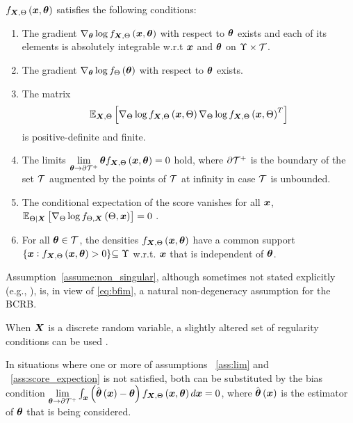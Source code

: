 \begin{assumption}
    \label{assum:bcrb_reg}
$\probt{\x,\p}{\X,\pr}$ 
satisfies the following conditions:  
\begin{enumerate}[label={\ref*{assum:bcrb_reg}}.\arabic*,labelsep=*, leftmargin=*]

\item\label{sas:derivative} The gradient $\nabla_{\p}\log\probt{\x,\p}{\X,\pr}$ with respect to $\bm{\theta}$  exists and {each of its elements} is absolutely integrable w.r.t $\bm{x}$ and $\bm{\theta}$ {on $\Upsilon \times \mathcal{T}$}.
\item\label{sas:derivative_prior} {The gradient $\nabla_{\bm{\theta}}\log f_{\Theta}\left(\bm{\theta}\right)$ with respect to $\bm{\theta}$  exists.}
\item \label{assume:non_singular}  The matrix  $$\expectation{\nabla_{\pr}\log\probt{\x,\pr}{\X,\pr}\nabla_{\pr}\log\probt{\x,\pr}{\X,\pr}^T}{\X,\pr} 
$$  is {positive-definite} and finite. 
\item The limits $\lim\limits_{\p\rightarrow\partial\Ps{^+}}\p\probt{\x,\p}{\X,\pr}=0$ hold, where $\partial\mathcal{T}{^+}$ is the boundary of the set $\mathcal{T}$ augmented by the points  of $\mathcal{T}$ at infinity  in case $\mathcal{T}$ is unbounded. \label{ass:lim}
\item  The conditional expectation of the score  {%
vanishes for all $\bm{x}$,} $\expectation{\nabla_{\pr}\log\probt{\pr,\x}{\pr,\X}}{\pr|\X}=0$ .\label{ass:score_expection}
\item For all $\bm{\theta}\in\mathcal{T}$, the densities $\probt{\x,\p}{\X,\pr}$ have a common support {$\{\x:\probt{\x,\p}{\X,\pr}>0\}{\subseteq \Upsilon}$}  w.r.t. {$\bm{x}$} that is independent of $\bm{\theta}$. \label{assume:common_support}
\end{enumerate}
{
\begin{remark}
   Assumption~\ref{assume:non_singular}, although sometimes not stated explicitly (e.g., \cite[pages 33-35]{van2007bayesian}), is, in view of \eqref{eq:bfim}, a natural non-degeneracy assumption for the BCRB.
\end{remark}
}

\begin{remark}
When $\X$ is a discrete random variable, a slightly altered set of
regularity conditions {can be used} \cite{zeitler2012bayesian}.
\end{remark}
  \begin{remark}
      In situations where {one or more of assumptions} ~\ref{ass:lim} %
      and ~\ref{ass:score_expection} is not satisfied, {both can be substituted by} the bias condition $\lim\limits_{\p\rightarrow\partial\Ps{^+}}\int_{\x}\brackets{\hat{\p}\brackets{\x}-\p}\probt{\x,\p}{\X,\pr}d \x =0$, {where $\hat{\bm{\theta}}\left(\bm{x}\right)$ is the estimator of $\bm{\theta}$ that is being considered.}
  \end{remark}
\end{assumption}
